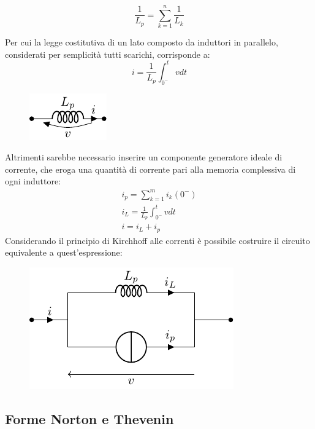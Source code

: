 \documentclass{article}
\numberwithin{equation}{subsection}
\begin{document}
\begin{equation*}
    \displaystyle\frac{1}{L_p}=\sum_{k=1}^n\frac{1}{L_k}
\end{equation*}

Per cui la legge costitutiva di un lato composto da induttori in parallelo, considerati per semplicità tutti scarichi, corrisponde a:
\begin{equation}
    i=\displaystyle\frac{1}{L_p}\int_{0^-}^t vdt
\end{equation}

\begin{figure}[H]%
    \centering
    \includegraphics{induttore-parallelo-equivalente.pdf}
    \label{fig:induttore-parallelo-equivalente}
\end{figure}

Altrimenti sarebbe necessario inserire un componente generatore ideale di corrente, che eroga una quantità di corrente pari alla memoria complessiva di ogni induttore:
\begin{gather*}
    i_p=\displaystyle\sum_{k=1}^mi_k(0^-)\\
    i_L=\displaystyle\frac{1}{L_p}\int_{0^-}^t vdt\\
    i=i_L+i_p
\end{gather*}
Considerando il principio di Kirchhoff alle correnti è possibile costruire il circuito equivalente a quest'espressione:
\begin{figure}[H]%
    \centering
    \includegraphics{induttore-parallelo-memoria-equivalente.pdf}%
    \label{fig:induttore-parallelo-memoria-equivalente}
\end{figure}

\subsection{Forme Norton e Thevenin}
\end{document}
